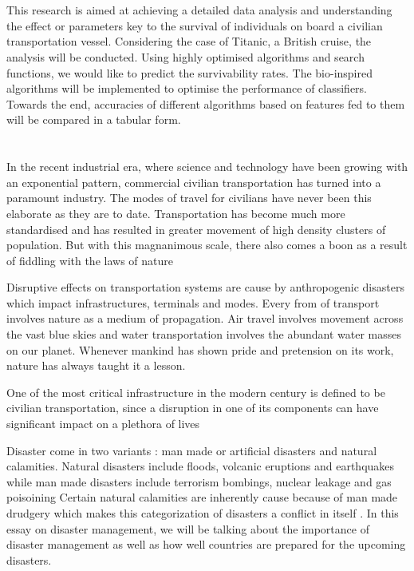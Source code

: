 \documentclass[12pt]{article}
\newcommand{\nd}{\noindent}
\newcommand{\secsize}{\fontsize{15pt}{12pt}\selectfont}
\begin{document}
\large  
\parskip 3mm 
\tableofcontents
\newpage
\listoffigures
\newpage
\section{\textbf{\secsize{ABSTRACT}}}
This research is aimed at achieving a detailed data analysis and understanding the effect or parameters key to the survival of individuals on board a civilian transportation vessel. Considering the case of Titanic, a British cruise, the analysis will be conducted. Using highly optimised algorithms and search functions, we would like to predict the survivability rates. The bio-inspired algorithms will be implemented to optimise the performance of classifiers. Towards the end, accuracies of different algorithms based on features fed to them will be compared in a tabular form.
\newpage
\section{\textbf{\secsize{INTRODUCTION}}}
In the recent industrial era, where science and technology have been growing with an exponential pattern, commercial civilian transportation has turned into a paramount industry. The modes of travel for civilians have never been this elaborate as they are to date. Transportation has become much more standardised and has resulted in greater movement of high density clusters of population. But with this magnanimous scale, there also comes a boon as a result of  fiddling with the laws of nature 

\nd Disruptive effects on transportation systems are cause by anthropogenic disasters which impact infrastructures, terminals and modes. Every from of transport involves nature as a medium of propagation. Air travel involves movement across the vast blue skies and water transportation involves the abundant water masses on our planet. Whenever mankind has shown pride and pretension on its work, nature has always taught it a lesson.

\nd One of the most critical infrastructure in the modern century is defined to be civilian transportation, since a disruption in one of its components can have significant impact on a plethora of lives

\nd Disaster come in two variants : man made or artificial disasters and natural calamities. Natural disasters include floods, volcanic eruptions and earthquakes while man made disasters include terrorism bombings, nuclear leakage and gas poisoining  Certain natural calamities are inherently cause because of man made drudgery which makes this categorization of disasters a conflict in itself . In this essay on disaster management, we will be talking about the importance of disaster management as well as how well countries are prepared for the upcoming disasters.
\end{document}
